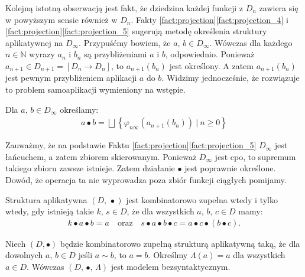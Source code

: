 Kolejną istotną obserwacją jest fakt, że dziedzina każdej funkcji z \(D_n\) zawiera się w powyższym sensie również w \(D_n\). Fakty \ref{fact:projection}\ref{fact:projection_4} i \ref{fact:projection}\ref{fact:projection_5} sugerują metodę określenia struktury aplikatywnej na \(D_\infty\). Przypuśćmy bowiem, że \(a,\,b\in D_\infty\). Wówczas dla każdego \(n\in\mathbb{N}\) wyrazy \(a_n\) i \(b_n\) są przybliżeniami \(a\) i \(b\), odpowiednio. Ponieważ \(a_{n+1}\in  D_{n+1}=[D_n\to D_n]\), to \(a_{n+1}(b_n)\) jest określony. A zatem \(a_{n+1}(b_n)\) jest pewnym przybliżeniem aplikacji \(a\) do \(b\). Widzimy jednocześnie, że rozwiązuje to problem samoaplikacji wymieniony na wstępie. 

\begin{definicja}%
  Dla \(a,\,b\in D_\infty\) określamy:
\begin{align*}
a \bullet b = \bigsqcup\left\{\varphi_{n\infty}(a_{n+1}(b_n))\ |\ n\geq 0\right\}%
\end{align*}
\end{definicja}

Zauważmy, że na podstawie Faktu \ref{fact:projection}\ref{fact:projection_5} \(D_\infty\) jest łańcuchem, a zatem zbiorem skierowanym. Ponieważ \(D_\infty\) jest cpo, to supremum takiego zbioru zawsze istnieje. Zatem działanie \(\bullet\) jest poprawnie określone.
Dowód, że operacja ta nie wyprowadza poza zbiór funkcji ciągłych pomijamy. 

\begin{fakt}\label{fact:model_a}%
Struktura aplikatywna \((D,\,\bullet)\) jest kombinatorowo zupełna wtedy i tylko wtedy, gdy istnieją takie \(k,\,s\in D\), że dla wszystkich \(a,\,b,\,c\in D\) mamy: 
\begin{align*}
k\bullet a\bullet b = a\quad \text{oraz}\quad s\bullet a \bullet b \bullet c = a\bullet c \bullet (b \bullet c).
\end{align*}
\end{fakt}

\begin{fakt}\label{fact:model}%
  Niech \((D,\bullet)\) będzie kombinatorowo zupełną strukturą aplikatywną taką, że
  dla dowolnych \(a,\,b\in D\) jeśli \(a\sim b\), to \(a=b\).
  Określmy \(\Lambda(a)=a\) dla wszystkich \(a\in D\). Wówczas \((D,\,\bullet,\,\Lambda)\) jest modelem bezsyntaktycznym. 
\end{fakt}

